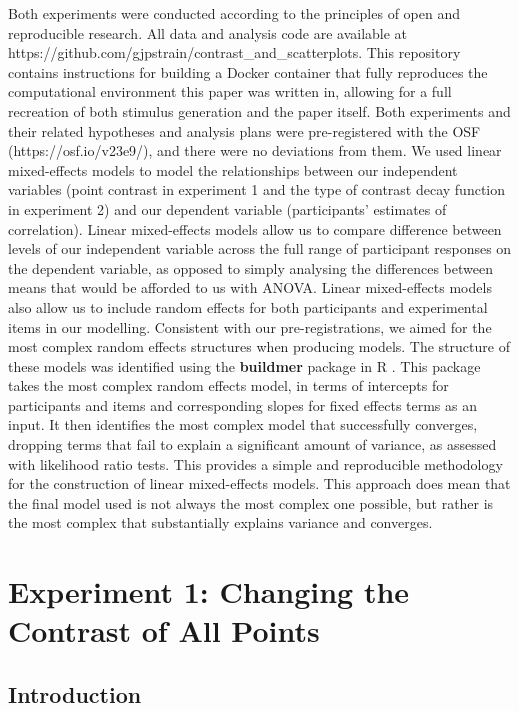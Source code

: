 \documentclass[preprint, 3p,
authoryear]{elsarticle} %
\begin{document}
Both experiments were conducted according to the principles of open and
reproducible research. All data and analysis code are available at
https://github.com/gjpstrain/contrast\_and\_scatterplots. This
repository contains instructions for building a Docker container that
fully reproduces the computational environment this paper was written
in, allowing for a full recreation of both stimulus generation and the
paper itself. Both experiments and their related hypotheses and analysis
plans were pre-registered with the OSF (https://osf.io/v23e9/), and
there were no deviations from them. We used linear mixed-effects models
to model the relationships between our independent variables (point
contrast in experiment 1 and the type of contrast decay function in
experiment 2) and our dependent variable (participants' estimates of
correlation). Linear mixed-effects models allow us to compare difference
between levels of our independent variable across the full range of
participant responses on the dependent variable, as opposed to simply
analysing the differences between means that would be afforded to us
with ANOVA. Linear mixed-effects models also allow us to include random
effects for both participants and experimental items in our modelling.
Consistent with our pre-registrations, we aimed for the most complex
random effects structures when producing models. The structure of these
models was identified using the \textbf{buildmer} package in R
\citep{voeten_buildmer_2022}. This package takes the most complex random
effects model, in terms of intercepts for participants and items and
corresponding slopes for fixed effects terms as an input. It then
identifies the most complex model that successfully converges, dropping
terms that fail to explain a significant amount of variance, as assessed
with likelihood ratio tests. This provides a simple and reproducible
methodology for the construction of linear mixed-effects models. This
approach does mean that the final model used is not always the most
complex one possible, but rather is the most complex that substantially
explains variance and converges.

\hypertarget{experiment-1-changing-the-contrast-of-all-points}{%
\section{Experiment 1: Changing the Contrast of All
Points}\label{experiment-1-changing-the-contrast-of-all-points}}

\hypertarget{introduction-1}{%
\subsection{Introduction}\label{introduction-1}}
\end{document}
